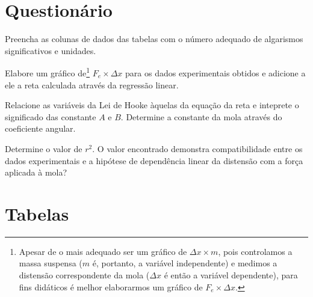 \vspace{5mm}

\section{Questionário}

\begin{question}[type={exam}]{2}
Preencha as colunas de dados das tabelas com o número adequado de algarismos significativos e unidades.
\end{question}

\begin{question}[type={exam}]{2} 
Elabore um gráfico de\footnote{Apesar de o mais adequado ser um gráfico de $\Delta x \times m$, pois controlamos a massa suspensa ($m$ é, portanto, a variável independente) e medimos a distensão correspondente da mola ($\Delta x$ é então a variável dependente), para fins didáticos é melhor elaborarmos um gráfico de  $F_e \times \Delta x$.} $F_e \times \Delta x$ para os dados experimentais obtidos e adicione a ele a reta calculada através da regressão linear.
\end{question}

\begin{question}[type={exam}]{4} 
Relacione as variáveis da Lei de Hooke àquelas da equação da reta e inteprete o significado das constante $A$ e $B$. Determine a constante da mola através do coeficiente angular.
\end{question}

\begin{question}[type={exam}]{2} 
Determine o valor de $r^2$. O valor encontrado demonstra compatibilidade entre os dados experimentais e a hipótese de dependência linear da distensão com a força aplicada à mola?
\end{question}
\vfill

\pagebreak
\section{Tabelas}

